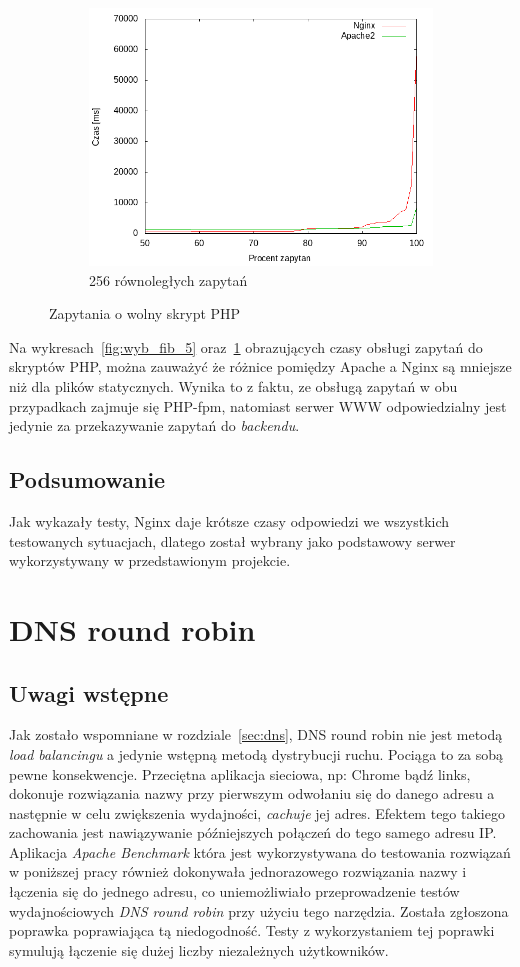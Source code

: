 \begin{figure}
\begin{subfigure}[h]{0.3\textwidth}
		\includegraphics[width=\textwidth]{testy/wybor_fib_15_256.png}
		\caption{256 równoległych zapytań}
	\end{subfigure}
	\caption{Zapytania o wolny skrypt PHP}\label{fig:wyb_fib_15}
\end{figure}
Na wykresach~\ref{fig:wyb_fib_5} oraz~\ref{fig:wyb_fib_15} obrazujących czasy obsługi zapytań do skryptów PHP, można zauważyć że różnice pomiędzy Apache a Nginx są mniejsze niż dla plików statycznych.
Wynika to z faktu, ze obsługą zapytań w obu przypadkach zajmuje się PHP-fpm, natomiast serwer WWW odpowiedzialny jest jedynie za przekazywanie zapytań do \textit{backendu}.
\subsection{Podsumowanie}
Jak wykazały testy, Nginx daje krótsze czasy odpowiedzi we wszystkich testowanych sytuacjach, dlatego został wybrany jako podstawowy serwer wykorzystywany w przedstawionym projekcie.
\clearpage
\section{DNS round robin}
\subsection{Uwagi wstępne}
Jak zostało wspomniane w rozdziale~\ref{sec:dns}, DNS round robin nie jest metodą \textit{load balancingu} a jedynie wstępną metodą dystrybucji ruchu.
Pociąga to za sobą pewne konsekwencje.
Przeciętna aplikacja sieciowa, np: Chrome bądź links, dokonuje rozwiązania nazwy przy pierwszym odwołaniu się do danego adresu a następnie w celu zwiększenia wydajności, \textit{cachuje} jej adres.
Efektem tego takiego zachowania jest nawiązywanie późniejszych połączeń do tego samego adresu IP\@.
Aplikacja \textit{Apache Benchmark} która jest wykorzystywana do testowania rozwiązań w poniższej pracy również dokonywała jednorazowego rozwiązania nazwy i łączenia się do jednego adresu, co uniemożliwiało przeprowadzenie testów wydajnościowych \textit{DNS round robin} przy użyciu tego narzędzia.
Została zgłoszona poprawka\cite{ab_dnsrr} poprawiająca tą niedogodność.
Testy z wykorzystaniem tej poprawki symulują łączenie się dużej liczby niezależnych użytkowników.

